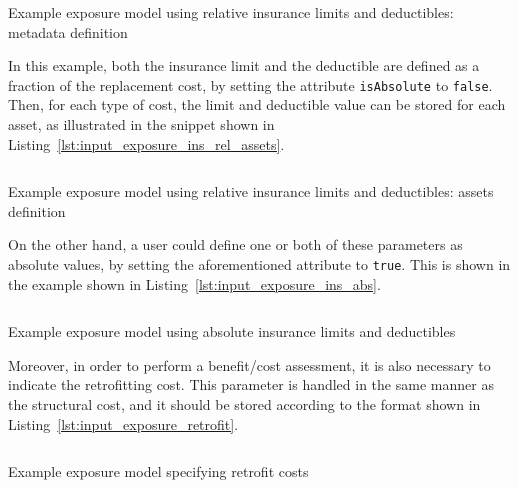 \begin{listing}[htbp]
  \inputminted[firstline=8,firstnumber=8,lastline=21,fontsize=\footnotesize,frame=single,linenos,bgcolor=lightgray]{xml}{oqum/risk/Verbatim/input_exposure_ins_rel.xml}
  \caption{Example exposure model using relative insurance limits and deductibles: metadata definition}
  \label{lst:input_exposure_ins_rel_metadata}
\end{listing}

In this example, both the insurance limit and the deductible are defined as a
fraction of the replacement cost, by setting the attribute \Verb+isAbsolute+
to \Verb+false+. Then, for each type of cost, the limit and deductible value
can be stored for each asset, as illustrated in the snippet shown in
Listing~\ref{lst:input_exposure_ins_rel_assets}.

\begin{listing}[htbp]
  \inputminted[firstline=22,firstnumber=22,lastline=32,fontsize=\footnotesize,frame=single,linenos,bgcolor=lightgray]{xml}{oqum/risk/Verbatim/input_exposure_ins_rel.xml}
  \caption{Example exposure model using relative insurance limits and deductibles: assets definition}
  \label{lst:input_exposure_ins_rel_assets}
\end{listing}

On the other hand, a user could define one or both of these parameters as
absolute values, by setting the aforementioned attribute to \Verb+true+. This
is shown in the example shown in Listing~\ref{lst:input_exposure_ins_abs}.

\begin{listing}[htbp]
  \inputminted[firstline=1,firstnumber=1,fontsize=\footnotesize,frame=single,linenos,bgcolor=lightgray]{xml}{oqum/risk/Verbatim/input_exposure_ins_abs.xml}
  \caption{Example exposure model using absolute insurance limits and deductibles}
  \label{lst:input_exposure_ins_abs}
\end{listing}

Moreover, in order to perform a benefit/cost assessment, it is also necessary
to indicate the retrofitting cost. This parameter is handled in the same
manner as the structural cost, and it should be stored according to the format
shown in Listing~\ref{lst:input_exposure_retrofit}.

\begin{listing}[htbp]
  \inputminted[firstline=1,firstnumber=1,fontsize=\footnotesize,frame=single,linenos,bgcolor=lightgray]{xml}{oqum/risk/Verbatim/input_exposure_retrofit.xml}
  \caption{Example exposure model specifying retrofit costs}
  \label{lst:input_exposure_retrofit}
\end{listing}

